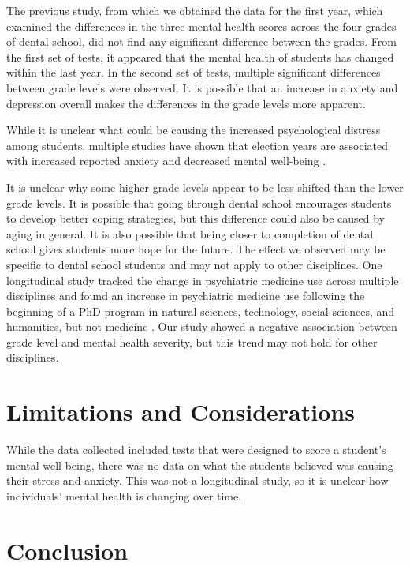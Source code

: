 \documentclass{article}
\begin{document}
The previous study, from which we obtained the data for the first year, which examined the differences in the three mental health scores across the four grades of dental school, did not find any significant difference between the grades. From the first set of tests, it appeared that the mental health of students has changed within the last year. In the second set of tests, multiple significant differences between grade levels were observed. It is possible that an increase in anxiety and depression overall makes the differences in the grade levels more apparent.

While it is unclear what could be causing the increased psychological distress among students, multiple studies have shown that election years are associated with increased reported anxiety and decreased mental well-being \cite{apa2024stress}\cite{mukhopadhyay2022elections}.

It is unclear why some higher grade levels appear to be less shifted than the lower grade levels. It is possible that going through dental school encourages students to develop better coping strategies, but this difference could also be caused by aging in general. It is also possible that being closer to completion of dental school gives students more hope for the future. The effect we observed may be specific to dental school students and may not apply to other disciplines. One longitudinal study tracked the change in psychiatric medicine use across multiple disciplines and found an increase in psychiatric medicine use following the beginning of a PhD program in natural sciences, technology, social sciences, and humanities, but not medicine \cite{bergvall2024impact}. Our study showed a negative association between grade level and mental health severity, but this trend may not hold for other disciplines.


\section{Limitations and Considerations} 
While the data collected included tests that were designed to score a student's mental well-being, there was no data on what the students believed was causing their stress and anxiety. 
This was not a longitudinal study, so it is unclear how individuals' mental health is changing over time.


\section{Conclusion}
\end{document}
